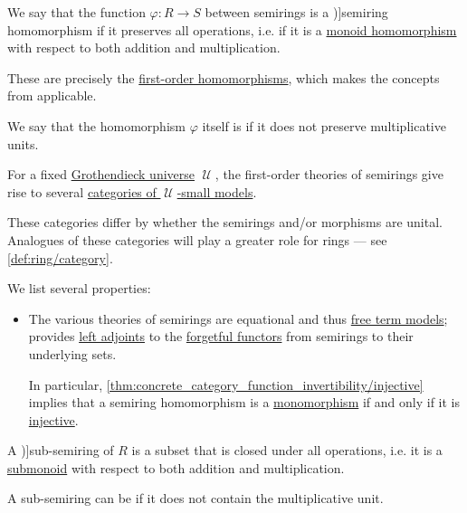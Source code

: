 \begin{definition}
\begin{thmenum}
     We say that the function \( \varphi: R \to S \) between semirings is a \term[en=morphism of semirings (\cite[105]{Golan1999Semirings})]{semiring homomorphism} if it preserves all operations, i.e. if it is a \hyperref[def:monoid/morphism]{monoid homomorphism} with respect to both addition and multiplication.

    These are precisely the \hyperref[def:fol_homomorphism]{first-order homomorphisms}, which makes the concepts from  applicable.

    We say that the homomorphism \( \varphi \) itself is  if it does not preserve multiplicative units.

     For a fixed \hyperref[def:grothendieck_universe]{Grothendieck universe} \( \mscrU \), the first-order theories of semirings give rise to several \hyperref[def:fol_theory_model_functor/obj]{categories of \( \mscrU \)-small models}.

    These categories differ by whether the semirings and/or morphisms are unital. Analogues of these categories will play a greater role for rings --- see \cref{def:ring/category}.

    We list several properties:
    \begin{itemize}
      \item The various theories of semirings are equational and thus \hyperref[def:fol_free_term_model]{free term models};  provides \hyperref[def:category_adjunction]{left adjoints} to the \hyperref[def:fol_theory_forgetful_functor/set]{forgetful functors} from semirings to their underlying sets.

      In particular, \cref{thm:concrete_category_function_invertibility/injective} implies that a semiring homomorphism is a \hyperref[def:morphism_invertibility/left_cancellative]{monomorphism} if and only if it is \hyperref[def:function_invertibility/injective]{injective}.
    \end{itemize}

     A \term[en=subsemiring (\cite[3]{Golan1999Semirings})]{sub-semiring} of \( R \) is a subset that is closed under all operations, i.e. it is a \hyperref[def:monoid/subobject]{submonoid} with respect to both addition and multiplication.

    A sub-semiring can be  if it does not contain the multiplicative unit.


\end{thmenum}
\end{definition}
